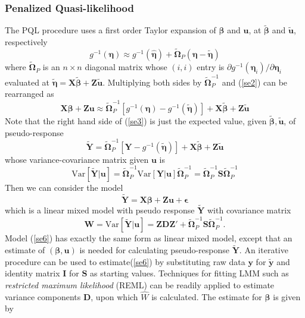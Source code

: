 	\subsubsection{Penalized Quasi-likelihood}
	The PQL procedure uses a first order Taylor expansion of $\bm \beta$ and $\bm u$, at $\tilde{\bm \beta} $ and $ \tilde{\bm u} $, respectively
	\begin{equation}\label{se2}
		g^{-1}(\bm\eta) \approx g^{-1}(\hat{\bm \eta}) + \tilde{\bm \Omega}_P(\bm \eta-\tilde{\bm \eta})
	\end{equation} 
	where $\tilde{\bm \Omega}_P$ is an $n\times n$ diagonal matrix whose $(i, i)$ entry is  $\partial {g^{-1}(\bm \eta_i)}/\partial \bm \eta_i $ evaluated at $\tilde{\bm \eta}= \bm X\tilde{\bm \beta} + \bm Z\tilde{\bm u}$. Multiplying both sides by $\bm \tilde{\Omega}_P^{-1}$ and (\ref{se2}) can be rearranged as 
	\begin{equation}\label{se3}
		\bm {X\beta} + \bm {Zu} \approx \tilde{\bm \Omega}_P^{-1}[g^{-1}(\bm\eta)- g^{-1}(\tilde{\bm \eta})]  + \bm{X}\tilde{\bm \beta} + \bm Z\tilde{\bm u}
	\end{equation}
	Note that the right hand side of (\ref{se3}) is just the expected value, given $\tilde{\bm \beta}, \tilde{\bm u}$, of	 pseudo-response 
	\begin{equation}\label{se4}
		\tilde{\bm Y }=\tilde{\bm \Omega}_P^{-1}[\bm Y- g^{-1}(\tilde{\bm \eta})]  + \bm{X}\tilde{\bm \beta} + \bm Z\tilde{\bm u}
	\end{equation}
	whose variance-covariance matrix given $\bm u$ is 
	\begin{equation}\label{se5}
		\text{Var}[\tilde{\bm Y }|\bm u] =\tilde{\bm \Omega}_P^{-1} \text{Var}[\bm Y|\bm u]\tilde{\bm \Omega}_P^{-1} = 
		\tilde{\bm \Omega}_P^{-1} \bm S \tilde{\bm \Omega}_P^{-1}
	\end{equation}
	Then we can consider the model 
	\begin{equation}\label{se6}
		\tilde{\bm Y } = \bm{X\beta} + \bm {Zu}  + \bm \epsilon
	\end{equation}
	which is a linear mixed model with pseudo response $\tilde{\bm Y }$ with covariance matrix 
	\begin{equation}
		\bm W = \text{Var}[ \tilde{\bm Y } |\bm u] = \bm{ZDZ'} + \tilde{\bm \Omega}_P^{-1} \bm S \tilde{\bm \Omega}_P^{-1}.
	\end{equation}
	Model (\ref{se6})  has exactly the same form as linear mixed model, except that an estimate of $(\bm\beta, \bm u)$  is needed for calculating pseudo-response $\tilde{\bm Y }$. An iterative procedure can be used to estimate(\ref{se6}) by substituting raw data $\bm y$ for $\tilde{\bm y}$  and identity matrix $\bm I$ for $\bm S$ as starting values. Techniques for fitting LMM such as \textit{restricted maximum likelihood} (REML) can be readily applied to estimate variance components $\bm D$, upon which $\hat{W}$ is calculated. The estimate for $\bm \beta$ is given by
